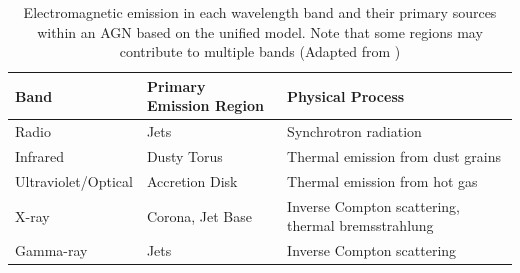 \begin{table}[h!]
    \centering
    \begin{tabular}{llp{4.5cm}}  %
        \hline
        \textbf{Band} & \textbf{Primary Emission Region} & \textbf{Physical Process} \\ \hline
        Radio & Jets & Synchrotron radiation \\
        Infrared & Dusty Torus & Thermal emission from dust grains \\
        Ultraviolet/Optical  & Accretion Disk & Thermal emission from hot gas \\
        X-ray & Corona, Jet Base & Inverse Compton scattering, thermal bremsstrahlung \\
        Gamma-ray & Jets & Inverse Compton scattering \\ 
        \hline
    \end{tabular}
    \caption{Electromagnetic emission in each wavelength band and their primary sources within an AGN based on the unified model. Note that some regions may contribute to multiple bands (Adapted from \citealt{padovani_active_2017})}
    \label{tab:agn_emission}
\end{table}
